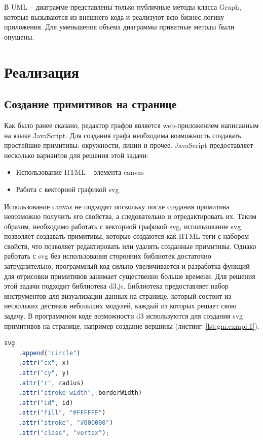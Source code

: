 В UML -- диаграмме представлены только публичные методы класса Graph, которые вызываются из внешнего кода и реализуют всю бизнес-логику приложения. Для уменьшения объема диаграммы приватные методы были опущены.

\section{Реализация}

\subsection{Создание примитивов на странице}
Как было ранее сказано, редактор графов является web-приложением написанным на языке JavaScript. Для создания графа необходима возможность создавать простейшие примитивы: окружности, линии и прочее. JavaScript предоставляет несколько вариантов для решения этой задачи:
\begin{itemize}
	\item Использование HTML -- элемента canvas
	\item Работа с векторной графикой svg
\end{itemize}
Использование сanvas не подходит поскольку после создания примитива невозможно получить его свойства, а следовательно и отредактировать их. Таким образом, необходимо работать с векторной графикой svg, использование svg позволяет создавать примитивы, которые создаются как HTML теги с набором свойств, что позволяет редактировать или удалять созданные примитивы. Однако работать с svg без использования сторонних библиотек достаточно затруднительно, программный код сильно увеличивается и разработка функций для отрисовки примитивов занимает существенно больше времени. Для решения этой задачи подходит библиотека d3.js. Библиотека предоставляет набор инструментов для визуализации данных на странице, который состоит из нескольких дестяков небольших модулей, каждый из которых решает свою задачу. В программном коде возможности d3 используются для создания svg примитивов на странице, например создание вершины (листинг~\ref{lst:gm.exmpl.1}).

\begin{lstlisting}[label={lst:gm.exmpl.1}, caption={Пример создание вершины с использование библиотеки d3}, language=JavaScript]
  svg
    .append("circle")
    .attr("cx", x)
    .attr("cy", y)
    .attr("r", radius)
    .attr("stroke-width", borderWidth)
    .attr("id", id)
    .attr("fill", "#FFFFFF")
    .attr("stroke", "#000000")
    .attr("class", "vertex");
\end{lstlisting}

